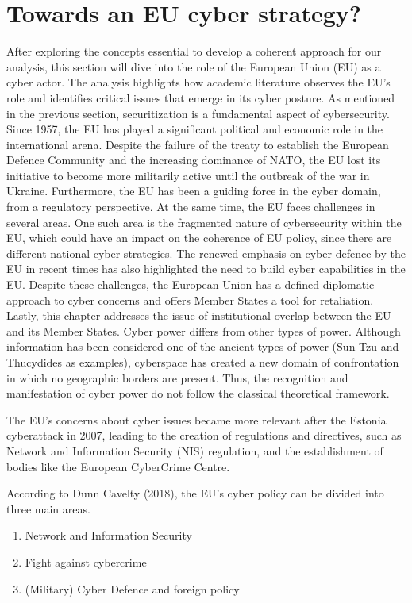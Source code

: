 \chapter{Towards an EU cyber strategy?}

After exploring the concepts essential to develop a coherent approach for our analysis, this section will dive into the role of the European Union (EU) as a cyber actor. The analysis highlights how academic literature observes the EU’s role and identifies critical issues that emerge in its cyber posture. As mentioned in the previous section, securitization is a fundamental aspect of cybersecurity. Since 1957, the EU has played a significant political and economic role in the international arena. Despite the failure of the treaty to establish the European Defence Community and the increasing dominance of NATO, the EU lost its initiative to become more militarily active until the outbreak of the war in Ukraine. Furthermore, the EU has been a guiding force in the cyber domain, from a regulatory perspective. At the same time, the EU faces challenges in several areas. One such area is the fragmented nature of cybersecurity within the EU, which could have an impact on the coherence of EU policy, since there are different national cyber strategies. The renewed emphasis on cyber defence by the EU in recent times has also highlighted the need to build cyber capabilities in the EU. Despite these challenges, the European Union has a defined diplomatic approach to cyber concerns and offers Member States a tool for retaliation. Lastly, this chapter addresses the issue of institutional overlap between the EU and its Member States. Cyber power differs from other types of power. Although information has been considered one of the ancient types of power (Sun Tzu and Thucydides as examples), cyberspace has created a new domain of confrontation in which no geographic borders are present. Thus, the recognition and manifestation of cyber power do not follow the classical theoretical framework.

The EU's concerns about cyber issues became more relevant after the Estonia cyberattack in 2007, leading to the creation of regulations and directives, such as Network and Information Security (NIS) regulation, and the establishment of bodies like the European CyberCrime Centre.


According to Dunn Cavelty (2018), the EU's cyber policy can be divided into three main areas.

\begin{enumerate}
    \item Network and Information Security
    \item Fight against cybercrime
    \item(Military) Cyber Defence and foreign policy 
\end{enumerate}

